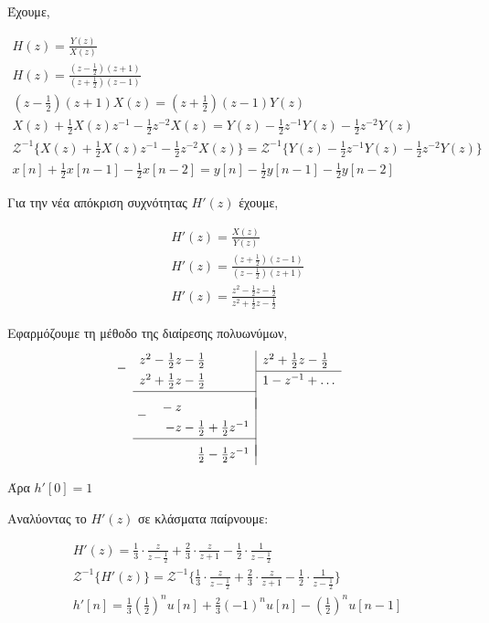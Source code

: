 \documentclass{assignment}
\newcommand{\dropsign}[1]{\smash{\llap{\raisebox{-.5\normalbaselineskip}{$#1$\hspace{2\arraycolsep}}}}}%
\newcommand{\longdivline}{\cline{1-1} \\[\dimexpr-\normalbaselineskip+\jot]}
\begin{document}
\begin{answers}
\answer

Έχουμε,

\begin{gather*}
H(z) = \frac{Y(z)}{X(z)} \\
H(z) = \frac{\left(z-\frac{1}{2}\right)(z+1)}{\left(z+\frac{1}{2}\right)(z-1)} \\
\left(z-\frac{1}{2}\right)(z+1)X(z) = \left(z+\frac{1}{2}\right)(z-1)Y(z) \\
X(z) + \frac{1}{2}X(z)z^{-1} - \frac{1}{2}z^{-2}X(z) = Y(z) - \frac{1}{2}z^{-1}Y(z) - \frac{1}{2}z^{-2}Y(z)\\
\mathscr{Z}^{-1}\bigg\{X(z) + \frac{1}{2}X(z)z^{-1} - \frac{1}{2}z^{-2}X(z)\bigg\} = 
\mathscr{Z}^{-1}\bigg\{Y(z) - \frac{1}{2}z^{-1}Y(z) - \frac{1}{2}z^{-2}Y(z)\bigg\} \\
x[n] + \frac{1}{2}x[n-1] - \frac{1}{2}x[n-2] = y[n] - \frac{1}{2}y[n-1] - \frac{1}{2}y[n-2]
\end{gather*}

\answer
Για την νέα απόκριση συχνότητας $H'(z)$ έχουμε,

\begin{gather*}
H'(z) = \frac{X(z)}{Y(z)} \\
H'(z) = \frac{\left(z+\frac{1}{2}\right)(z-1)}{\left(z-\frac{1}{2}\right)(z+1)}\\
H'(z) = \frac{z^2-\frac{1}{2}z-\frac{1}{2}}{z^2+\frac{1}{2}z-\frac{1}{2}}
\end{gather*}

Εφαρμόζουμε τη μέθοδο της διαίρεσης πολυωνύμων,
\begin{equation*}
  \setlength\extrarowheight{2pt}
  \begin{array}{r|l}
    \dropsign{-} z^2 - \frac{1}{2}z-\frac{1}{2}\hphantom{{}+{}\frac{0}{1}z^{-1}}& z^2+\frac{1}{2}z-\frac{1}{2} \\[2pt] \cline{2-2}
    z^2+\frac{1}{2}z-\frac{1}{2}\hphantom{{}+{}\frac{0}{1}z^{-1}}& 1 - z^{-1} + \dots \\[2pt] \longdivline
     \dropsign{-} -z\hphantom{{}-{}\frac{0}{1}{}+{}\frac{0}{1}z^{-1}}&\\[2pt]
                  -z-\frac{1}{2}+\frac{1}{2}z^{-1}&\\[2pt] \longdivline
                     \frac{1}{2}-\frac{1}{2}z^{-1}&\\[2pt]
  \end{array}
\end{equation*}

Άρα $h'[0] = 1$

Αναλύοντας το $H'(z)$ σε κλάσματα παίρνουμε:

\begin{gather*}
Η'(z) = \frac{1}{3}\cdot\frac{z}{z-\frac{1}{2}} + \frac{2}{3}\cdot\frac{z}{z+1} - \frac{1}{2}\cdot\frac{1}{z-\frac{1}{2}}\\
\mathscr{Z}^{-1}\bigg\{H'(z)\bigg\} = \mathscr{Z}^{-1}\bigg\{\frac{1}{3}\cdot\frac{z}{z-\frac{1}{2}} + \frac{2}{3}\cdot\frac{z}{z+1} - \frac{1}{2}\cdot\frac{1}{z-\frac{1}{2}}\bigg\}\\
h'[n] = \frac{1}{3}\left(\frac{1}{2}\right)^nu[n] + \frac{2}{3}(-1)^nu[n] - \left(\frac{1}{2}\right)^nu[n-1]
\end{gather*}

\end{answers}
\end{document}
